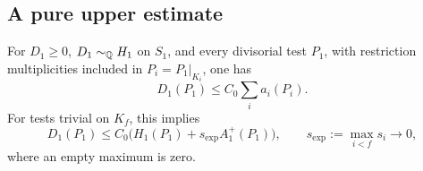 \subsection{A pure upper estimate}

\begin{proposition}\label{b:pure-upper}
For \(D_1\ge0\), \(D_1\sim_\mathbb Q H_1\) on \(S_1\), and every divisorial
test \(P_1\), with restriction multiplicities included in
\(P_i=P_1|_{K_i}\), one has
\begin{equation}\label{eq:C3}
                         D_1(P_1)\le C_0\sum_i a_i(P_i).
\end{equation}
For tests trivial on \(K_f\), this implies
\begin{equation}\label{eq:C4}
 D_1(P_1)\le C_0\bigl(H_1(P_1)+s_{\exp}A_1^+(P_1)\bigr),
 \qquad s_{\exp}:=\max_{i<f}s_i\longrightarrow0,
\end{equation}
where an empty maximum is zero.
\end{proposition}

